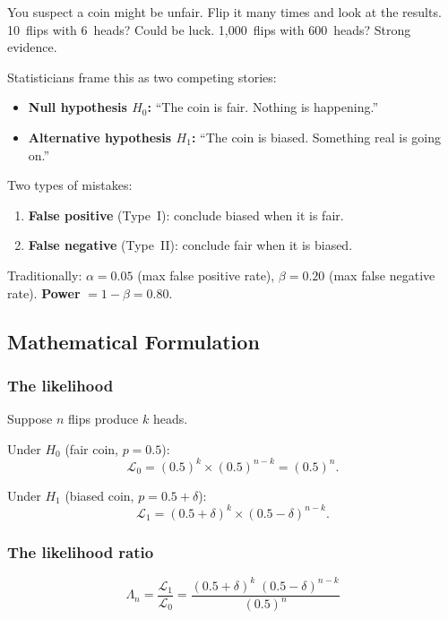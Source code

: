 \documentclass[12pt, a4paper]{article}
\newcommand{\LR}{\Lambda}              %
\begin{document}
\begin{intuition}
You suspect a coin might be unfair.  Flip it many times and look at the
results.  10~flips with 6~heads?  Could be luck.  1,000~flips with 600~heads?
Strong evidence.

Statisticians frame this as two competing stories:
\begin{itemize}[nosep]
  \item \textbf{Null hypothesis $H_0$:} ``The coin is fair.  Nothing is happening.''
  \item \textbf{Alternative hypothesis $H_1$:} ``The coin is biased.  Something real is going on.''
\end{itemize}

Two types of mistakes:
\begin{enumerate}[nosep]
  \item \textbf{False positive} (Type~I): conclude biased when it is fair.
  \item \textbf{False negative} (Type~II): conclude fair when it is biased.
\end{enumerate}
Traditionally: $\alpha = 0.05$ (max false positive rate),
$\beta = 0.20$ (max false negative rate).
\textbf{Power} $= 1 - \beta = 0.80$.
\end{intuition}

\subsection{Mathematical Formulation}

\subsubsection*{The likelihood}

Suppose $n$ flips produce $k$ heads.

Under $H_0$ (fair coin, $p = 0.5$):
\[
  \mathcal{L}_0
  = (0.5)^k \times (0.5)^{n-k}
  = (0.5)^n.
\]

Under $H_1$ (biased coin, $p = 0.5 + \delta$):
\[
  \mathcal{L}_1
  = (0.5 + \delta)^k \times (0.5 - \delta)^{n-k}.
\]

\subsubsection*{The likelihood ratio}

\[
  \boxed{\LR_n
  = \frac{\mathcal{L}_1}{\mathcal{L}_0}
  = \frac{(0.5+\delta)^k \;(0.5-\delta)^{n-k}}{(0.5)^n}}
\]
\end{document}
